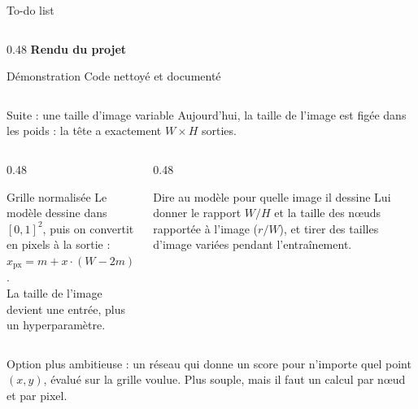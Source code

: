 \documentclass[aspectratio=169,11pt]{beamer}
\begin{document}
\begin{frame}{To-do list}
\begin{columns}[T]
\begin{column}{0.48\textwidth}
\vspace{2pt}
\textbf{Rendu du projet}
\begin{itemize}
\setlength{\itemsep}{0pt}
\afaire Démonstration
\afaire Code nettoyé et documenté
\end{itemize}




\end{column}
\end{columns}


\end{frame}


\begin{frame}{Suite : une taille d'image variable}
\small Aujourd'hui, la taille de l'image est figée dans les poids : la tête a exactement $W \times H$ sorties.

\vspace{0.3cm}
\begin{columns}[T]
\begin{column}{0.48\textwidth}
\begin{block}{Grille normalisée}
\small Le modèle dessine dans $[0,1]^2$, puis on convertit en pixels à la sortie :\\
$x_{\text{px}} = m + x \cdot (W - 2m)$.\\
La taille de l'image devient une entrée, plus un hyperparamètre.
\end{block}
\end{column}
\begin{column}{0.48\textwidth}
\begin{block}{Dire au modèle pour quelle image il dessine}
\small Lui donner le rapport $W/H$ et la taille des nœuds rapportée à l'image ($r/W$), et tirer des tailles d'image variées pendant l'entraînement.
\end{block}
\end{column}
\end{columns}

\vspace{0.3cm}
\scriptsize\textcolor{gris}{Option plus ambitieuse : un réseau qui donne un score pour n'importe quel point $(x, y)$, évalué sur la grille voulue. Plus souple, mais il faut un calcul par nœud et par pixel.}
\end{frame}
\end{document}
